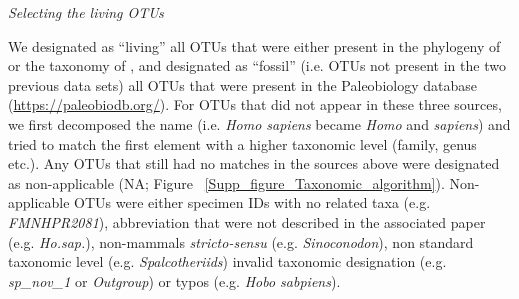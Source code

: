 \documentclass[12pt,letterpaper]{article}
\renewcommand{\subsection}[1]{%
\bigskip
\begin{center}
\begin{large}
\normalfont\itshape #1
\end{large}
\end{center}}
\begin{document}
\subsection{Selecting the living OTUs}
We designated as ``living'' all OTUs that were either present in the phylogeny of \cite{bininda-emondsthe2007} or the taxonomy of \cite{wilson2005mammal}, and designated as ``fossil'' (i.e. OTUs not present in the two previous data sets) all OTUs that were present in the Paleobiology database (\url{https://paleobiodb.org/}).
For OTUs that did not appear in these three sources, we first decomposed the name (i.e. \textit{Homo sapiens} became \textit{Homo} and \textit{sapiens}) and tried to match the first element with a higher taxonomic level (family, genus etc.).
Any OTUs that still had no matches in the sources above were designated as non-applicable (NA; Figure ~\ref{Supp_figure_Taxonomic_algorithm}).
Non-applicable OTUs were either specimen IDs with no related taxa (e.g. \textit{FMNHPR2081}), abbreviation that were not described in the associated paper (e.g. \textit{Ho.sap.}), non-mammals \textit{stricto-sensu} (e.g. \textit{Sinoconodon}), non standard taxonomic level (e.g. \textit{Spalcotheriids}) invalid taxonomic designation (e.g. \textit{sp\_nov\_1} or \textit{Outgroup}) or typos (e.g. \textit{Hobo sabpiens}).
\end{document}
